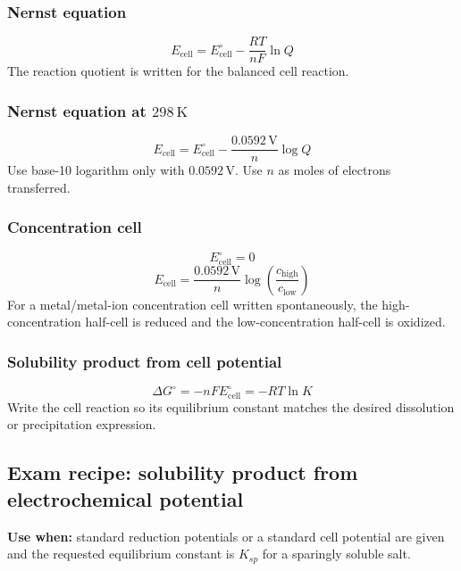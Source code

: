 \subsubsection{Nernst equation}
\begin{equation}
\label{eq:electrochem:nernst}
E_{\mathrm{cell}}=E^\circ_{\mathrm{cell}}-\frac{RT}{nF}\ln Q
\end{equation}
The reaction quotient is written for the balanced cell reaction.

\subsubsection{Nernst equation at \(298\,\mathrm K\)}
\begin{equation}
\label{eq:electrochem:nernst-298}
E_{\mathrm{cell}}=E^\circ_{\mathrm{cell}}-\frac{0.0592\,\mathrm V}{n}\log Q
\end{equation}
Use base-10 logarithm only with \(0.0592\,\mathrm V\). Use \(n\) as moles of electrons transferred.

\subsubsection{Concentration cell}
\begin{equation}
\label{eq:electrochem:concentration-standard-potential}
E^\circ_{\mathrm{cell}}=0
\end{equation}
\begin{equation}
\label{eq:electrochem:concentration-cell-potential}
E_{\mathrm{cell}}=\frac{0.0592\,\mathrm V}{n}\log\left(\frac{c_{\mathrm{high}}}{c_{\mathrm{low}}}\right)
\end{equation}
For a metal/metal-ion concentration cell written spontaneously, the high-concentration half-cell is reduced and the low-concentration half-cell is oxidized.

\subsubsection{Solubility product from cell potential}
\begin{equation}
\label{eq:electrochem:cell-equilibrium-gibbs}
\Delta G^\circ=-nFE^\circ_{\mathrm{cell}}=-RT\ln K
\end{equation}
Write the cell reaction so its equilibrium constant matches the desired dissolution or precipitation expression.

\subsection{Exam recipe: solubility product from electrochemical potential}
\textbf{Use when:} standard reduction potentials or a standard cell potential are given and the requested equilibrium constant is \(K_{sp}\) for a sparingly soluble salt.

